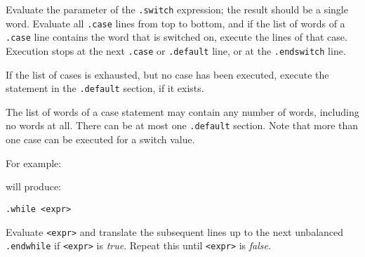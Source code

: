 \begin{desc}
Evaluate the parameter of the \verb'.switch' expression; the result
should be a single word. Evaluate all \verb'.case' lines from top
to bottom, and if the list of words of a \verb'.case' line contains
the word that is switched on, execute the lines of that case.
Execution stops at the next \verb'.case' or \verb'.default' line,
or at the \verb'.endswitch' line.

If the list of cases is exhausted, but no case has been executed,
execute the statement in the \verb'.default' section, if it exists.

The list of words of a case statement may contain any number of words,
including no words at all. There can be at most one \verb'.default'
section. Note that more than one case can be executed for a switch value.
\par
For example:
\begin{showfile}

\end{showfile}
will produce:
\begin{showfile}

\end{showfile}
\end{desc}
\begin{verbatim}
.while <expr>
\end{verbatim}
\begin{desc}
Evaluate {\tt <expr>} and translate the subsequent lines up to the next
unbalanced {\tt .endwhile} if {\tt <expr>} is {\it true}.
Repeat this until {\tt <expr>} is {\it false}.
\end{desc}
